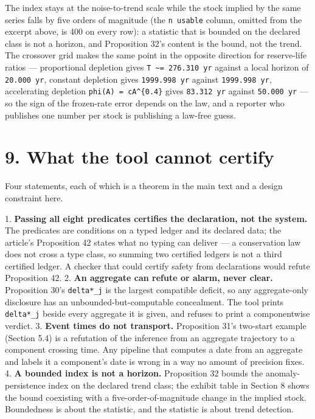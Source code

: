 \documentclass[11pt]{article}
\begin{document}
The index stays at the noise-to-trend scale while the stock implied by the same series falls by five orders of magnitude (the \texttt{n usable} column, omitted from the excerpt above, is 400 on every row): a statistic that is bounded on the declared class is not a horizon, and Proposition 32's content is the bound, not the trend. The crossover grid makes the same point in the opposite direction for reserve-life ratios --- proportional depletion gives \texttt{T \textasciitilde{}= 276.310 yr} against a local horizon of \texttt{20.000 yr}, constant depletion gives \texttt{1999.998 yr} against \texttt{1999.998 yr}, accelerating depletion \texttt{phi(A) = cA\textasciicircum{}\{0.4\}} gives \texttt{83.312 yr} against \texttt{50.000 yr} --- so the sign of the frozen-rate error depends on the law, and a reporter who publishes one number per stock is publishing a law-free guess.

\vspace{0.8em}

\section*{9. What the tool cannot certify}\label{9-what-the-tool-cannot-certify}

Four statements, each of which is a theorem in the main text and a design constraint here.

1. \textbf{Passing all eight predicates certifies the declaration, not the system.} The predicates are conditions on a typed ledger and its declared data; the article's Proposition 42 states what no typing can deliver --- a conservation law does not cross a type class, so summing two certified ledgers is not a third certified ledger. A checker that could certify safety from declarations would refute Proposition 42. 2. \textbf{An aggregate can refute or alarm, never clear.} Proposition 30's \texttt{delta*\_j} is the largest compatible deficit, so any aggregate-only disclosure has an unbounded-but-computable concealment. The tool prints \texttt{delta*\_j} beside every aggregate it is given, and refuses to print a componentwise verdict. 3. \textbf{Event times do not transport.} Proposition 31's two-start example (Section 5.4) is a refutation of the inference from an aggregate trajectory to a component crossing time. Any pipeline that computes a date from an aggregate and labels it a component's date is wrong in a way no amount of precision fixes. 4. \textbf{A bounded index is not a horizon.} Proposition 32 bounds the anomaly-persistence index on the declared trend class; the exhibit table in Section 8 shows the bound coexisting with a five-order-of-magnitude change in the implied stock. Boundedness is about the statistic, and the statistic is about trend detection.
\end{document}

